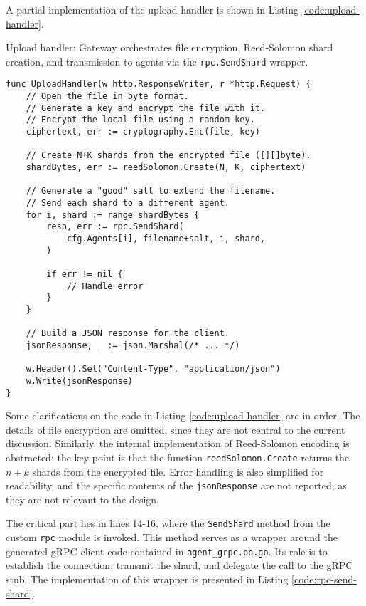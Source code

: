 A partial implementation of the upload handler is shown in Listing \ref{code:upload-handler}.

\begin{listing}
\caption{Upload handler: Gateway orchestrates file encryption, Reed-Solomon shard creation, and transmission to agents via the \texttt{rpc.SendShard} wrapper.}
\label{code:upload-handler}
\begin{verbatim}
func UploadHandler(w http.ResponseWriter, r *http.Request) {
    // Open the file in byte format.
    // Generate a key and encrypt the file with it.
    // Encrypt the local file using a random key.
    ciphertext, err := cryptography.Enc(file, key)
    
    // Create N+K shards from the encrypted file ([][]byte).
    shardBytes, err := reedSolomon.Create(N, K, ciphertext)

    // Generate a "good" salt to extend the filename.
    // Send each shard to a different agent.
    for i, shard := range shardBytes {
        resp, err := rpc.SendShard(
            cfg.Agents[i], filename+salt, i, shard,
        )

        if err != nil {
            // Handle error
        }
    }
    
    // Build a JSON response for the client.
    jsonResponse, _ := json.Marshal(/* ... */)

    w.Header().Set("Content-Type", "application/json")
    w.Write(jsonResponse)
}

\end{verbatim}
\end{listing}

Some clarifications on the code in Listing \ref{code:upload-handler} are in order.
The details of file encryption are omitted, since they are not central to the current discussion. Similarly, the internal implementation of Reed-Solomon encoding is abstracted: the key point is that the function \texttt{reedSolomon.Create} returns the $n+k$ shards from the encrypted file. Error handling is also simplified for readability, and the specific contents of the \texttt{jsonResponse} are not reported, as they are not relevant to the design.

The critical part lies in lines 14-16, where the \texttt{SendShard} method from the custom \texttt{rpc} module is invoked. This method serves as a wrapper around the generated gRPC client code contained in \texttt{agent\_grpc.pb.go}. Its role is to establish the connection, transmit the shard, and delegate the call to the gRPC stub. The implementation of this wrapper is presented in Listing \ref{code:rpc-send-shard}.

